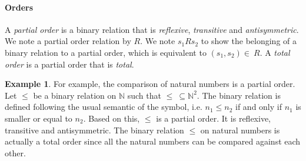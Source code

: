\documentclass[letterpaper]{article}
\theoremstyle{definition}
\newtheorem{example}{Example}[subsection]
\begin{document}
\paragraph{Orders}

A \textit{partial order} is a binary relation that is \textit{reflexive},
\textit{transitive} and \textit{antisymmetric}. We note a
partial order relation by $R$.
We note $s_1 R  s_2$ to show the belonging of
a binary relation to a partial order, which is equivalent
to $(s_1, s_2) \in \ R$.
A \textit{total order} is a partial order that is \textit{total}.

\begin{example}

For example, the comparison of natural numbers is a partial order.
Let $\leq$ be a binary relation on $\mathbb{N}$
such that $\leq \ \subseteq \mathbb{N}^2$. The binary relation is defined
following the usual semantic of the symbol, i.e. $n_1 \leq n_2$ if and
only if $n_1$ is smaller or equal to $n_2$.
Based on this, $\leq$ is a partial order. It is
reflexive, transitive and antisymmetric.
The binary relation $\leq$ on natural numbers is actually a total
order since all the natural numbers can be compared against each other.

\end{example}
\end{document}
